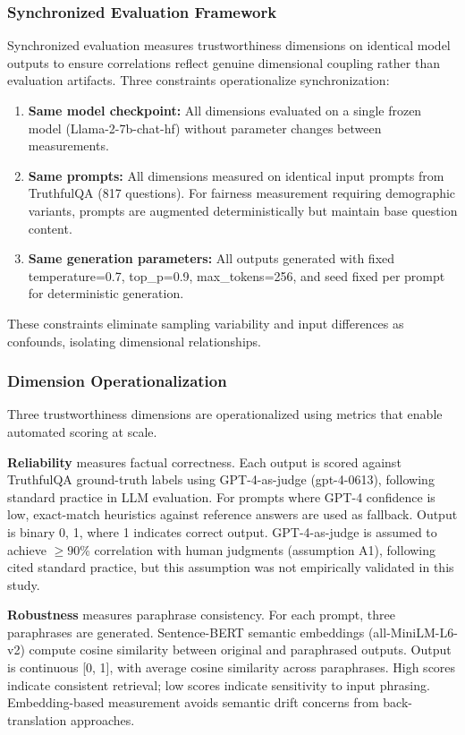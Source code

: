 
\subsubsection{Synchronized Evaluation Framework}

Synchronized evaluation measures trustworthiness dimensions on identical model outputs to ensure correlations reflect genuine dimensional coupling rather than evaluation artifacts. Three constraints operationalize synchronization:

\begin{enumerate}
\item \textbf{Same model checkpoint:} All dimensions evaluated on a single frozen model (Llama-2-7b-chat-hf) without parameter changes between measurements.
\item \textbf{Same prompts:} All dimensions measured on identical input prompts from TruthfulQA (817 questions). For fairness measurement requiring demographic variants, prompts are augmented deterministically but maintain base question content.
\item \textbf{Same generation parameters:} All outputs generated with fixed temperature=0.7, top\_p=0.9, max\_tokens=256, and seed fixed per prompt for deterministic generation.
\end{enumerate}

These constraints eliminate sampling variability and input differences as confounds, isolating dimensional relationships.

\subsubsection{Dimension Operationalization}

Three trustworthiness dimensions are operationalized using metrics that enable automated scoring at scale.

\textbf{Reliability} measures factual correctness. Each output is scored against TruthfulQA ground-truth labels using GPT-4-as-judge (gpt-4-0613), following standard practice in LLM evaluation. For prompts where GPT-4 confidence is low, exact-match heuristics against reference answers are used as fallback. Output is binary {0, 1}, where 1 indicates correct output. GPT-4-as-judge is assumed to achieve $\geq 90$\% correlation with human judgments (assumption A1), following cited standard practice, but this assumption was not empirically validated in this study.

\textbf{Robustness} measures paraphrase consistency. For each prompt, three paraphrases are generated. Sentence-BERT semantic embeddings (all-MiniLM-L6-v2) compute cosine similarity between original and paraphrased outputs. Output is continuous [0, 1], with average cosine similarity across paraphrases. High scores indicate consistent retrieval; low scores indicate sensitivity to input phrasing. Embedding-based measurement avoids semantic drift concerns from back-translation approaches.

